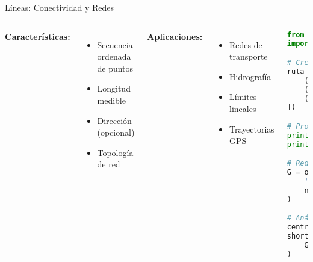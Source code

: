 \documentclass[10pt]{beamer}
\begin{document}
\begin{frame}[fragile]{Líneas: Conectividad y Redes}
    \begin{columns}
        \textbf{Características:}
        \begin{itemize}
            \item Secuencia ordenada de puntos
            \item Longitud medible
            \item Dirección (opcional)
            \item Topología de red
        \end{itemize}
        
        \textbf{Aplicaciones:}
        \begin{itemize}
            \item Redes de transporte
            \item Hidrografía
            \item Límites lineales
            \item Trayectorias GPS
        \end{itemize}
        
        \begin{lstlisting}[language=Python, caption=Líneas y redes]
from shapely.geometry import LineString
import osmnx as ox

# Crear línea simple
ruta = LineString([
    (-70.669, -33.449),
    (-70.665, -33.445),
    (-70.660, -33.440)
])

# Propiedades
print(f"Longitud: {ruta.length}")
print(f"Punto medio: {ruta.centroid}")

# Red vial con OSMnx
G = ox.graph_from_place(
    'Providencia, Chile',
    network_type='drive'
)

# Análisis de red
centrality = ox.betweenness_centrality(G)
shortest_path = ox.shortest_path(
    G, orig, dest, weight='length'
)
        \end{lstlisting}
    \end{columns}
\end{frame}
\end{document}
